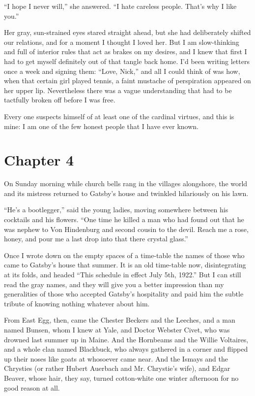 \documentclass{znotebook}
\begin{document}
``I hope I never will,'' she answered. ``I hate careless people. That’s why I like you.''

Her gray, sun-strained eyes stared straight ahead, but she had deliberately shifted our relations, and for a moment I thought I loved her. But I am slow-thinking and full of interior rules that act as brakes on my desires, and I knew that first I had to get myself definitely out of that tangle back home. I’d been writing letters once a week and signing them: ``Love, Nick,'' and all I could think of was how, when that certain girl played tennis, a faint mustache of perspiration appeared on her upper lip. Nevertheless there was a vague understanding that had to be tactfully broken off before I was free.

Every one suspects himself of at least one of the cardinal virtues, and this is mine: I am one of the few honest people that I have ever known.

\chapter{Chapter 4}

On Sunday morning while church bells rang in the villages alongshore, the world and its mistress returned to Gatsby’s house and twinkled hilariously on his lawn.

``He’s a bootlegger,'' said the young ladies, moving somewhere between his cocktails and his flowers. ``One time he killed a man who had found out that he was nephew to Von Hindenburg and second cousin to the devil. Reach me a rose, honey, and pour me a last drop into that there crystal glass.''

Once I wrote down on the empty spaces of a time-table the names of those who came to Gatsby’s house that summer. It is an old time-table now, disintegrating at its folds, and headed ``This schedule in effect July 5th, 1922.'' But I can still read the gray names, and they will give you a better impression than my generalities of those who accepted Gatsby’s hospitality and paid him the subtle tribute of knowing nothing whatever about him.

From East Egg, then, came the Chester Beckers and the Leeches, and a man named Bunsen, whom I knew at Yale, and Doctor Webster Civet, who was drowned last summer up in Maine. And the Hornbeams and the Willie Voltaires, and a whole clan named Blackbuck, who always gathered in a corner and flipped up their noses like goats at whosoever came near. And the Ismays and the Chrysties (or rather Hubert Auerbach and Mr. Chrystie’s wife), and Edgar Beaver, whose hair, they say, turned cotton-white one winter afternoon for no good reason at all.
\end{document}
